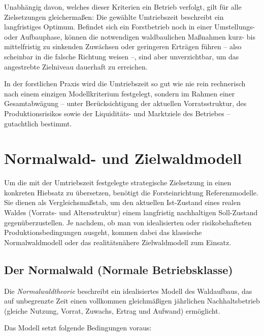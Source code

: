 \documentclass[twocolumn, paper=a4, fontsize=10pt]{scrartcl}
\begin{document}
Unabhängig davon, welches dieser Kriterien ein Betrieb verfolgt, gilt für alle Zielsetzungen gleichermaßen: Die gewählte Umtriebszeit beschreibt ein langfristiges Optimum. Befindet sich ein Forstbetrieb noch in einer Umstellungs- oder Aufbauphase, können die notwendigen waldbaulichen Maßnahmen kurz- bis mittelfristig zu sinkenden Zuwächsen oder geringeren Erträgen führen -- also scheinbar in die falsche Richtung weisen --, sind aber unverzichtbar, um das angestrebte Zielniveau dauerhaft zu erreichen.

In der forstlichen Praxis wird die Umtriebszeit so gut wie nie rein rechnerisch nach einem einzigen Modellkriterium festgelegt, sondern im Rahmen einer Gesamtabwägung -- unter Berücksichtigung der aktuellen Vorratsstruktur, des Produktionsrisikos sowie der Liquiditäts- und Marktziele des Betriebes -- gutachtlich bestimmt.

\section{Normalwald- und Zielwaldmodell}

Um die mit der Umtriebszeit festgelegte strategische Zielsetzung in einen konkreten Hiebsatz zu übersetzen, benötigt die Forsteinrichtung Referenzmodelle. Sie dienen als Vergleichsmaßstab, um den aktuellen Ist-Zustand eines realen Waldes (Vorrats- und Altersstruktur) einem langfristig nachhaltigen Soll-Zustand gegenüberzustellen. Je nachdem, ob man von idealisierten oder risikobehafteten Produktionsbedingungen ausgeht, kommen dabei das klassische Normalwaldmodell oder das realitätsnähere Zielwaldmodell zum Einsatz.

\subsection{Der Normalwald (Normale Betriebsklasse)}
\label{ssec:normalwald}

Die \emph{Normalwaldtheorie} beschreibt ein idealisiertes Modell des Waldaufbaus, das auf unbegrenzte Zeit einen vollkommen gleichmäßigen jährlichen Nachhaltsbetrieb (gleiche Nutzung, Vorrat, Zuwachs, Ertrag und Aufwand) ermöglicht.

Das Modell setzt folgende Bedingungen voraus:
\end{document}
